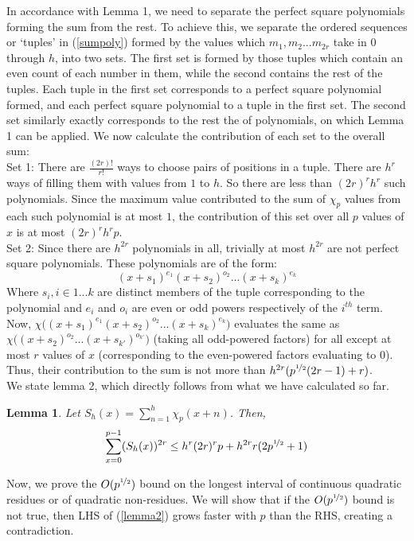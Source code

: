 \documentclass{article}
\newtheorem{lemma}{Lemma}
\begin{document}
In accordance with Lemma 1, we need to separate the perfect square polynomials forming the sum from the rest. To achieve this, we separate the ordered sequences or `tuples' in (\ref{sumpoly}) formed by the values which $m_1, m_2...m_{2r}$ take in $0$ through $h$, into two sets. The first set is formed by those tuples which contain an even count of each number in them, while the second contains the rest of the tuples. Each tuple in the first set corresponds to a perfect square polynomial formed, and each perfect square polynomial to a tuple in the first set. The second set similarly exactly corresponds to the rest the of polynomials, on which Lemma 1 can be applied. We now calculate the contribution of each set to the overall sum:\\
Set 1: There are $\frac{(2r)!}{r!}$ ways to choose pairs of positions in a tuple. There are $h^{r}$ ways of filling them with values from $1$ to $h$. So there are less than $(2r)^r h^{r}$ such polynomials. Since the maximum value contributed to the sum of $\chi_p$ values from each such polynomial is at most $1$, the contribution of this set over all $p$ values of $x$ is at most $(2r)^r h^{r}p$.\\
Set 2: Since there are $h^{2r}$ polynomials in all, trivially at most $h^{2r}$ are not perfect square polynomials. These polynomials are of the form:
$$(x+s_1)^{e_1}(x+s_2)^{o_2}...(x+s_k)^{e_k}$$
Where $s_i, i\in 1...k$ are distinct members of the tuple corresponding to the polynomial and $e_i$ and $o_i$ are even or odd powers respectively of the $i^{th}$ term. Now, $\chi\big((x+s_1)^{e_1}(x+s_2)^{o_2}...(x+s_k)^{e_k}\big)$ evaluates the same as $\chi\big((x+s_2)^{o_2}...(x+s_{k'})^{o_{k'}}\big)$ (taking all odd-powered factors) for all except at most $r$ values of $x$ (corresponding to the even-powered factors evaluating to $0$). Thus, their contribution to the sum is not more than $h^{2r}(p^{\nicefrac{1}{2}}(2r-1)+r)$. 
\\
We state lemma 2, which directly follows from what we have calculated so far.
%
\begin{lemma}
Let $S_h(x)=\sum\limits_{n=1}^{h}\chi_p(x+n)$. Then,
\begin{equation} \label{lemma2}
\sum\limits_{x=0}^{p-1}(S_h(x))^{2r}\leq h^{r}(2r)^{r}p+h^{2r}r(2p^{\nicefrac{1}{2}}+1)
\end{equation}
\end{lemma}
%
Now, we prove the $O(p^{\nicefrac{1}{2}})$ bound on the longest interval of continuous quadratic residues or of quadratic non-residues. We will show that if the $O(p^{\nicefrac{1}{2}})$ bound is not true, then LHS of (\ref{lemma2}) grows faster with $p$ than the RHS, creating a contradiction.\\
\end{document}
